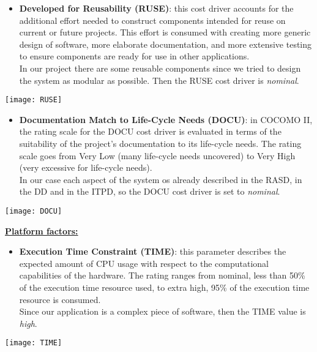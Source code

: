 \begin{itemize}
	\item \textbf{Developed for Reusability (RUSE)}: this cost driver accounts for the additional effort needed to construct components intended for reuse on current or future projects. This effort is consumed with creating more generic design of software, more elaborate documentation, and more extensive testing to ensure components are ready for use in other applications. \\ In our project there are some reusable components since we tried to design the system as modular as possible. Then the RUSE cost driver is \textit{nominal}.
\end{itemize}
\begin{center}
	\texttt{[image: RUSE]}
\end{center}

\begin{itemize}
	\item \textbf{Documentation Match to Life-Cycle Needs (DOCU)}: in COCOMO II, the rating scale for the DOCU cost driver is evaluated in terms of the suitability of the project’s documentation to its life-cycle needs. The rating scale goes from Very Low (many life-cycle needs uncovered) to Very High (very excessive for life-cycle needs). \\ In our case each aspect of the system os already described in the RASD, in the DD and in the ITPD, so the DOCU cost driver is set to \textit{nominal}.
\end{itemize}
\begin{center}
	\texttt{[image: DOCU]}
\end{center}
\textbf{\underline{Platform factors:}}

\begin{itemize}
	\item \textbf{Execution Time Constraint (TIME)}: this parameter describes the expected amount of CPU usage with respect to the computational capabilities of the hardware. The rating ranges from	nominal, less than 50\% of the execution time resource used, to extra high, 95\% of the execution time resource is consumed. \\Since our application is a complex piece of software, then the TIME value is \textit{high}.
\end{itemize}
\begin{center}
	\texttt{[image: TIME]}
\end{center}	

